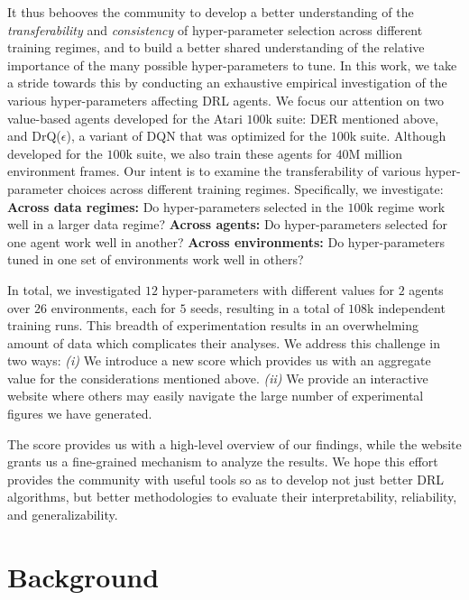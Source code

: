 \documentclass[10pt]{article} %
\begin{document}
It thus behooves the community to develop a better understanding of the {\em transferability} and {\em consistency} of hyper-parameter selection across different training regimes, and to build a better shared understanding of the relative importance of the many possible hyper-parameters to tune. In this work, we take a stride towards this by conducting an exhaustive empirical investigation of the various hyper-parameters affecting DRL agents. We focus our attention on two value-based agents developed for the Atari $100$k suite: DER mentioned above, and DrQ($\epsilon$), a variant of DQN that was optimized for the $100$k suite. Although developed for the $100$k suite, we also train these agents for $40$M million environment frames. Our intent is to examine the transferability of various hyper-parameter choices across different training regimes. Specifically, we investigate:
{\bf Across data regimes:} Do hyper-parameters selected in the $100$k regime work well in a larger data regime? {\bf Across agents:} Do hyper-parameters selected for one agent work well in another? {\bf Across environments:} Do hyper-parameters tuned in one set of environments work well in others?

In total, we investigated $12$ hyper-parameters with different values for $2$ agents over $26$ environments, each for $5$ seeds, resulting in a total of $108$k independent training runs. This breadth of experimentation results in an overwhelming amount of data which complicates their analyses. We address this challenge in two ways: \textit{(i)} We introduce a new score which provides us with an aggregate value for the considerations mentioned above. \textit{(ii)} We provide an interactive website where others may easily navigate the large number of experimental figures we have generated.

The score provides us with a high-level overview of our findings, while the website grants us a fine-grained mechanism to analyze the results. We hope this effort provides the community with useful tools so as to develop not just better DRL algorithms, but better methodologies to evaluate their interpretability, reliability, and generalizability.
\section{Background}
\label{sec:brackground}

\end{document}

